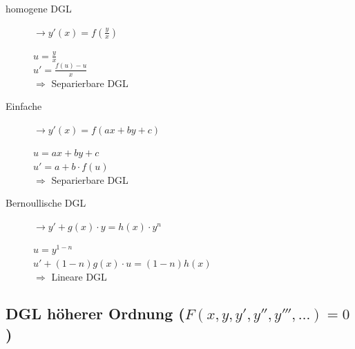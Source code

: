 \documentclass[a4paper]{article}
\begin{document}
		\begin{fmerke}
			\begin{description}
				\item[homogene DGL] $\rightarrow y'(x)=f(\frac{y}{x})$
					\begin{multicols}{3}
						$u=\frac{y}{x}$ \\
						\columnbreak
						$u'=\frac{f(u)-u}{x}$  \\
						\columnbreak \hspace{6mm}
						$\Rightarrow$ Separierbare DGL
					\end{multicols}

					\item[Einfache] $\rightarrow y'(x)=f(ax+by+c)$
					\begin{multicols}{3}
						$u=ax+by+c$ \\
						\columnbreak
						$u'=a+b \cdot f(u)$  \\
						\columnbreak \hspace{6mm}
						$\Rightarrow$ Separierbare DGL
					\end{multicols}

					\item[Bernoullische DGL] $\rightarrow y'+g(x)\cdot y=h(x)\cdot y^n$
					\begin{multicols}{3}
						$u=y^{1-n}$ \\
						\columnbreak
						$u'+(1-n)g(x) \cdot u = (1-n)h(x)$  \\
						\columnbreak \hspace{6mm}
						$\Rightarrow$ Lineare DGL
					\end{multicols}
			\end{description}
		\end{fmerke}

	\subsection{DGL höherer Ordnung ($F(x,y,y',y'',y''',\ldots) = 0$)}
\end{document}

